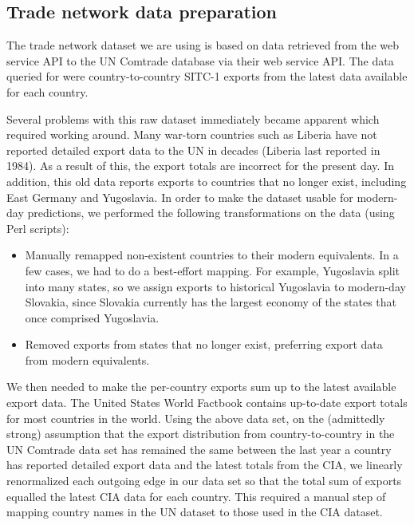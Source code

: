 \documentclass[10pt, journal,onecolumn]{IEEEtran}
\begin{document}
\subsection{{Trade network data preparation}}

The trade network dataset we are using is based on data retrieved from the web service API to the
UN Comtrade database \citep{uncomtradedata} via their web service API.
The data queried for were country-to-country SITC-1 exports from the latest data available
for each country.

Several problems with this raw dataset immediately became apparent which required working around.
Many war-torn countries such as Liberia have not reported detailed export data
to the UN in decades (Liberia last reported in 1984). As a result of this, the export totals
are incorrect for the present day. In addition, this old data reports exports to countries that
no longer exist, including East Germany and Yugoslavia. In order to make the dataset usable for
modern-day predictions, we performed the following transformations on the data (using Perl scripts):

\begin{itemize}
\item Manually remapped non-existent countries to their modern equivalents.
      In a few cases, we had to do a best-effort mapping. For example, Yugoslavia split into many
      states, so we assign exports to historical Yugoslavia to modern-day Slovakia,
      since Slovakia currently has the largest economy of the states that once comprised Yugoslavia.
\item Removed exports from states that no longer exist, preferring export data from
      modern equivalents.
\end{itemize}

We then needed to make the per-country exports sum up to the latest available export data.
The United States \citep{ciatotalexports} World Factbook contains up-to-date export totals
for most countries in the world. Using the above data set, on the (admittedly strong) assumption
that the export distribution
from country-to-country in the UN Comtrade data set has remained the same between the last year a
country has reported detailed export data and the latest totals from the CIA, we linearly renormalized
each outgoing edge in our data set so that the total sum of exports equalled the latest CIA data
for each country.
This required a manual step of mapping country names in the UN dataset to those used in
the CIA dataset.
\end{document}
